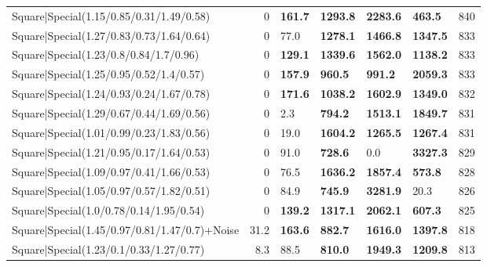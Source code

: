 \begin{tabular}{lrllllr}
 Square|Special(1.15/0.85/0.31/1.49/0.58)                      &             0   & \textbf{161.7} & \textbf{1293.8} & \textbf{2283.6} & \textbf{463.5}  &          840 \\
 Square|Special(1.27/0.83/0.73/1.64/0.64)                      &             0   & 77.0           & \textbf{1278.1} & \textbf{1466.8} & \textbf{1347.5} &          833 \\
 Square|Special(1.23/0.8/0.84/1.7/0.96)                        &             0   & \textbf{129.1} & \textbf{1339.6} & \textbf{1562.0} & \textbf{1138.2} &          833 \\
 Square|Special(1.25/0.95/0.52/1.4/0.57)                       &             0   & \textbf{157.9} & \textbf{960.5}  & \textbf{991.2}  & \textbf{2059.3} &          833 \\
 Square|Special(1.24/0.93/0.24/1.67/0.78)                      &             0   & \textbf{171.6} & \textbf{1038.2} & \textbf{1602.9} & \textbf{1349.0} &          832 \\
 Square|Special(1.29/0.67/0.44/1.69/0.56)                      &             0   & 2.3            & \textbf{794.2}  & \textbf{1513.1} & \textbf{1849.7} &          831 \\
 Square|Special(1.01/0.99/0.23/1.83/0.56)                      &             0   & 19.0           & \textbf{1604.2} & \textbf{1265.5} & \textbf{1267.4} &          831 \\
 Square|Special(1.21/0.95/0.17/1.64/0.53)                      &             0   & 91.0           & \textbf{728.6}  & 0.0             & \textbf{3327.3} &          829 \\
 Square|Special(1.09/0.97/0.41/1.66/0.53)                      &             0   & 76.5           & \textbf{1636.2} & \textbf{1857.4} & \textbf{573.8}  &          828 \\
 Square|Special(1.05/0.97/0.57/1.82/0.51)                      &             0   & 84.9           & \textbf{745.9}  & \textbf{3281.9} & 20.3            &          826 \\
 Square|Special(1.0/0.78/0.14/1.95/0.54)                       &             0   & \textbf{139.2} & \textbf{1317.1} & \textbf{2062.1} & \textbf{607.3}  &          825 \\
 Square|Special(1.45/0.97/0.81/1.47/0.7)+Noise                 &            31.2 & \textbf{163.6} & \textbf{882.7}  & \textbf{1616.0} & \textbf{1397.8} &          818 \\
 Square|Special(1.23/0.1/0.33/1.27/0.77)                       &             8.3 & 88.5           & \textbf{810.0}  & \textbf{1949.3} & \textbf{1209.8} &          813 \\

\end{tabular}
